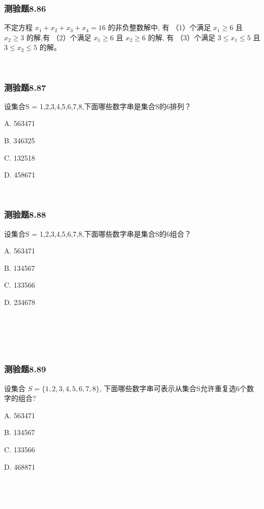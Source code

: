 \documentclass[UTF8, heading=true]{ctexart}
\begin{document}
\subsubsection{测验题8.86}

不定方程 $x_1+x_2+x_3+x_4=16$ 的非负整数解中, 有 （1）个满足 $x_1 \geq 6$ 且 $x_2 \geq 3$ 的解,有
（2）个满足 $x_1 \geq 6$ 且 $x_2 \geq 6$ 的解, 有 （3）个满足 $3 \leq x_1 \leq 5$ 且 $3 \leq x_2 \leq 5$ 的解。

\textcolor{white}{答案：（1） 120 （2） 35 （3） 81}

\subsubsection{测验题8.87}
设集合S = {1,2,3,4,5,6,7,8},下面哪些数字串是集合S的6排列？

A. 563471

B. 346325

C. 132518

D. 458671

\textcolor{white}{答案：AD}

\subsubsection{测验题8.88}

设集合S = {1,2,3,4,5,6,7,8},下面哪些数字串是集合S的6组合？

A. 563471

B. 134567

C. 133566

D. 234678

\textcolor{white}{答案：BD}

\textcolor{white}{解析：注意 1、非降序 2、默认情况下不重复（例如测验题8.89明确说明了允许重复才可以重复）。}

\subsubsection{测验题8.89}

设集合 $S=\{1,2,3,4,5,6,7,8\}$, 下面哪些数字串可表示从集合S允许重复选6个数字的组合?

A. 563471

B. 134567

C. 133566

D. 468871

\textcolor{white}{答案：BC}

\textcolor{white}{解析：数字的组合要求数字以非降序进行排列。}
\end{document}
